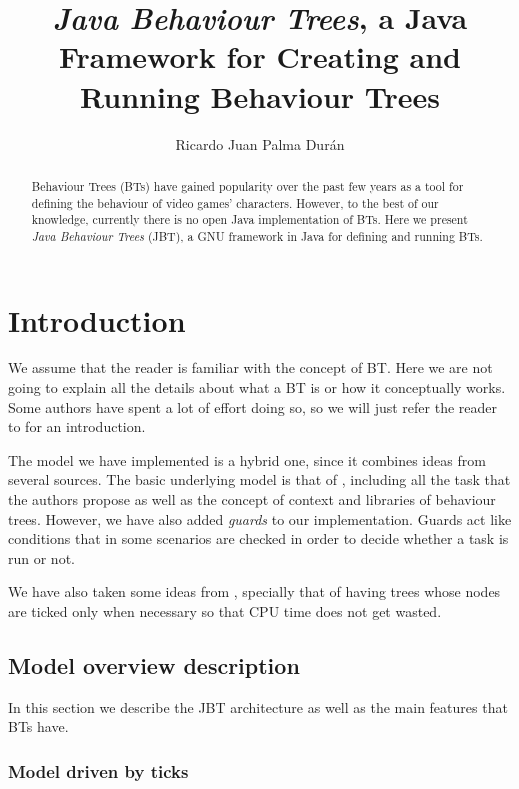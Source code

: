 \documentclass[a4paper,10pt]{article}
\title{\textit{Java Behaviour Trees}, a Java Framework for Creating and Running Behaviour Trees}
\author{Ricardo Juan Palma Dur\'an}
\begin{document}
\maketitle

\begin{abstract}

Behaviour Trees (BTs) have gained popularity over the past few years as a tool for defining the behaviour of video games' characters. However, to the best of our knowledge, currently there is no open Java implementation of BTs. Here we present \textit{Java Behaviour Trees} (JBT), a GNU framework in Java for defining and running BTs.

\end{abstract}

\section{Introduction}

We assume that the reader is familiar with the concept of BT. Here we are not going to explain all the details about what a BT is or how it conceptually works. Some authors have spent a lot of effort doing so, so we will just refer the reader to \cite{Millington09} for an introduction.

The model we have implemented is a hybrid one, since it combines ideas from several sources. The basic underlying model is that of \cite{Millington09}, including all the task that the authors propose as well as the concept of context and libraries of behaviour trees. However, we have also added \textit{guards} to our implementation. Guards act like conditions that in some scenarios are checked in order to decide whether a task is run or not. 

We have also taken some ideas from \cite{AIGameDev}, specially that of having trees whose nodes are ticked only when necessary so that CPU time does not get wasted.

\subsection{Model overview description}

In this section we describe the JBT architecture as well as the main features that BTs have.

\subsubsection{Model driven by ticks}
\end{document}
